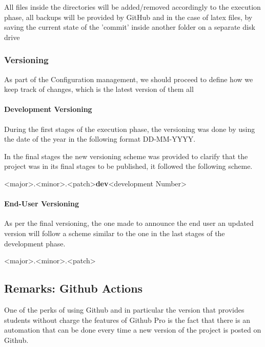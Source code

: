 All files inside the directories will be added/removed accordingly to the execution phase, all backups will be provided by GitHub and in the case of latex files, by saving the current state of the 'commit' inside another folder on a separate disk drive
\subsubsection{Versioning}
As part of the Configuration management, we should proceed to define how we keep track of changes, which is the latest version of them all
\paragraph{Development Versioning}
During the first stages of the execution phase, the versioning was done by using the date of the year in the following format DD-MM-YYYY.

In the final stages the new versioning scheme was provided to clarify that the project was in its final stages to be published, it followed the following scheme.
\begin{center}
    <major>.<minor>.<patch>\textbf{dev}<development Number>
\end{center}
\paragraph{End-User Versioning}
As per the final versioning, the one made to announce the end user an updated version will follow a scheme similar to the one in the last stages of the development phase.
\begin{center}
    <major>.<minor>.<patch>
\end{center}

\subsection{Remarks: Github Actions}
One of the perks of using Github and in particular the version that provides students without charge the features of Github Pro is the fact that there is an automation that can be done every time a new version of the project is posted on Github.

